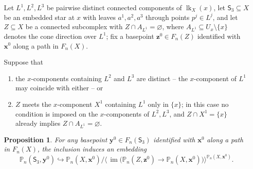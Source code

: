 \documentclass[reqno]{amsart}
\newtheorem{proposition}[theorem]{Proposition}
\theoremstyle{definition}
\newcommand\bfx{\mathbf{x}}
\newcommand\bfy{\mathbf{y}}
\newcommand\bfz{\mathbf{z}}
\newcommand\sfS{\mathsf{S}}
\newcommand{\PB}{\mathbb{P}}
\newcommand{\im}{\operatorname{im}}
\newcommand{\co}[1]{\mathopen{\langle}#1\mathclose{\rangle}} %
\newcommand{\base}{\bfx^0}
\DeclareMathOperator{\lk}{lk}
\numberwithin{equation}{section}
\begin{document}
Let \(L^1,L^2,L^3\) be pairwise distinct connected components of
\(\lk_X(x)\), let \(\sfS_3\subseteq X\) be an embedded star at
\(x\) with leaves \(a^1,a^2,a^3\) through points \(p^j\in L^j\),
and let \(Z\subseteq X\) be a connected subcomplex with
\(Z\cap A_{L^1}=\varnothing\), where
\(A_{L^1}\subseteq U_x\setminus\{x\}\) denotes the cone direction
over \(L^1\); fix a basepoint \(\bfz^0\in F_n(Z)\) identified with
\(\base\) along a path in \(F_n(X)\). 

Suppose that
\begin{enumerate}[label=(\alph*),leftmargin=2em]
\item the \(x\)-components containing \(L^2\) and \(L^3\) are
      distinct -- the \(x\)-component of \(L^1\) may coincide with
      either -- or
\item \(Z\) meets the \(x\)-component \(X^1\) containing \(L^1\)
      only in \(\{x\}\); in this case no condition is imposed on
      the \(x\)-components of \(L^2,L^3\), and
      \(Z\cap X^1=\{x\}\) already implies
      \(Z\cap A_{L^1}=\varnothing\).
\end{enumerate}

\begin{proposition}\label{prop:star-avoiding-embedding}
For any basepoint
\(\bfy^0\in F_n(\sfS_3)\) identified with \(\base\) along a path in
\(F_n(X)\), the inclusion induces an embedding
\[
\PB_n(\sfS_3,\bfy^0)\hookrightarrow
\PB_n(X,\base)\big/
\co{\,\im\bigl(\PB_n(Z,\bfz^0)\to\PB_n(X,\base)\bigr)}^{\PB_n(X,\base)}.
\]
\end{proposition}
\end{document}
